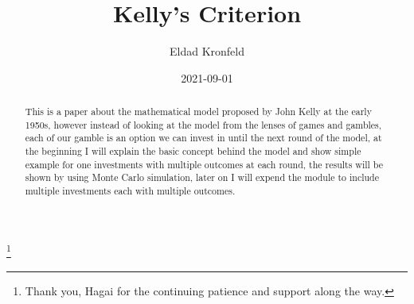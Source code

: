 \documentclass{article}
\title{Kelly's Criterion}
\date{2021-09-01}
\author{Eldad Kronfeld}
\begin{document}
	\maketitle
	\thanks{Thank you, Hagai for the continuing patience and support along the way.}
	\tableofcontents
	\newpage
	\begin{abstract}
		This is a paper about the mathematical model proposed by John Kelly at the early 1950s, 
		however instead of looking at the model from the lenses of games and gambles, each of our gamble is an option we can invest in until the next round of the model, at the beginning I will explain the basic concept behind the model and show simple example for one investments with multiple outcomes at each round, the results will be shown by using Monte Carlo simulation, later on I will expend the module to include multiple investments each with multiple outcomes.
	\end{abstract}
\end{document}
